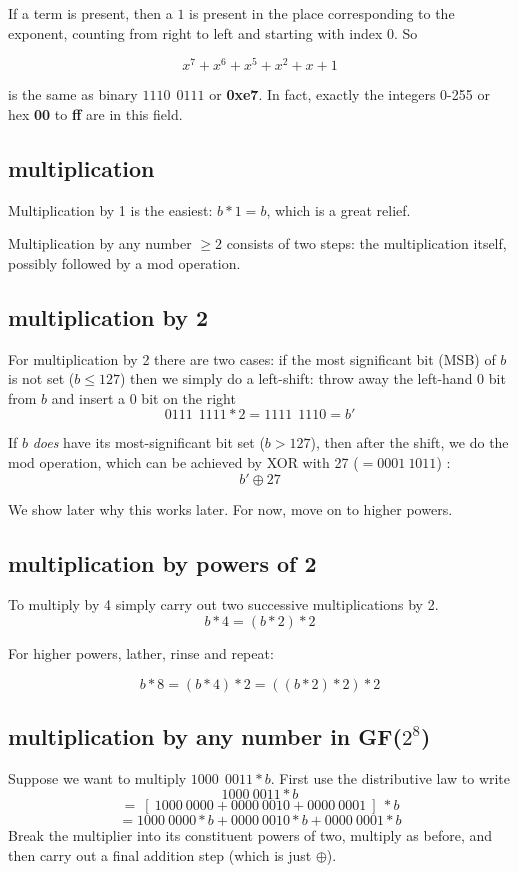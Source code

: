 \documentclass[11pt, oneside]{article}
\begin{document}
If a term is present, then a $1$ is present in the place corresponding to the exponent, counting from right to left and starting with index 0. So

\[ x^7 + x^6 + x^5 + x^2 + x + 1 \]

is the same as binary $1110 \  \  0111$ or \textbf{0xe7}.  In fact, exactly the integers 0-255 or hex \textbf{00} to \textbf{ff} are in this field.

\subsection*{multiplication}

Multiplication by 1 is the easiest:  $b * 1 = b$, which is a great relief.

Multiplication by any number $\ge 2$ consists of two steps:  the multiplication itself, possibly followed by a mod operation.

\subsection*{multiplication by 2}

For multiplication by 2 there are two cases:  if the most significant bit (MSB) of $b$ is not set ($b \le 127$) then we simply do a left-shift:  throw away the left-hand 0 bit from $b$ and insert a $0$ bit on the right
\[ 0111 \  \  1111 * 2 =  1111 \  \  1110 = b' \]

If $b$ \emph{does} have its most-significant bit set ($b > 127$), then after the shift, we do the mod operation, which can be achieved by XOR with 27 ($ = 0001\ 1011$)	:
\[ b' \oplus 27 \]

We show later why this works later.  For now, move on to higher powers.

\subsection*{multiplication by powers of 2}

To multiply by 4 simply carry out two successive multiplications by 2.
\[ b * 4 = (b * 2) * 2 \]

For higher powers, lather, rinse and repeat:

\[ b * 8 = (b * 4) * 2 = ((b * 2) * 2) * 2 \]

\subsection*{multiplication by any number in GF($2^8$)}
Suppose we want to multiply $ 1000 \  \  0011 * b$.  First use the distributive law to write
\[ 1000 \   0011 * b \]
\[ = \ [ \ 1000 \   0000  + 0000 \  0010  + 0000 \   0001 \ ] \ * b \]
\[ = 1000 \  0000 * b + 0000 \  0010 * b + 0000 \  0001 * b \]
Break the multiplier into its constituent powers of two, multiply as before, and then carry out a final  addition step (which is just $\oplus$).
\end{document}
